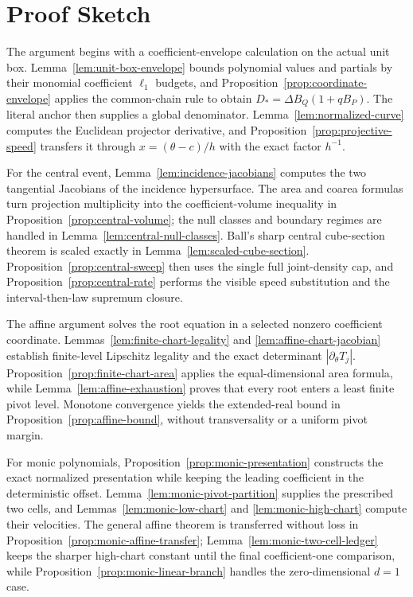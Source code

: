 \section{Proof Sketch}

The argument begins with a coefficient-envelope calculation on the actual
unit box.  Lemma~\ref{lem:unit-box-envelope} bounds polynomial values and
partials by their monomial coefficient $\ell_1$ budgets, and
Proposition~\ref{prop:coordinate-envelope} applies the common-chain rule to
obtain $D_*=\Delta B_Q(1+qB_P)$.  The literal anchor then supplies a global
denominator.  Lemma~\ref{lem:normalized-curve} computes the Euclidean
projector derivative, and Proposition~\ref{prop:projective-speed} transfers it
through $x=(\theta-c)/h$ with the exact factor $h^{-1}$.

For the central event, Lemma~\ref{lem:incidence-jacobians} computes the two
tangential Jacobians of the incidence hypersurface.  The area and coarea
formulas \citep{federer1969gmt} turn projection multiplicity into the
coefficient-volume inequality in Proposition~\ref{prop:central-volume}; the
null classes and boundary regimes are handled in
Lemma~\ref{lem:central-null-classes}.  Ball's sharp central cube-section
theorem \citep{ball1986cube} is scaled exactly in
Lemma~\ref{lem:scaled-cube-section}.  Proposition~\ref{prop:central-sweep}
then uses the single full joint-density cap, and
Proposition~\ref{prop:central-rate} performs the visible speed substitution
and the interval-then-law supremum closure.

The affine argument solves the root equation in a selected nonzero
coefficient coordinate.  Lemmas~\ref{lem:finite-chart-legality} and
\ref{lem:affine-chart-jacobian} establish finite-level Lipschitz legality and
the exact determinant $|\partial_\theta T_j|$.
Proposition~\ref{prop:finite-chart-area} applies the equal-dimensional area
formula, while Lemma~\ref{lem:affine-exhaustion} proves that every root enters
a least finite pivot level.  Monotone convergence yields the extended-real
bound in Proposition~\ref{prop:affine-bound}, without transversality or a
uniform pivot margin.

For monic polynomials, Proposition~\ref{prop:monic-presentation} constructs
the exact normalized presentation while keeping the leading coefficient in
the deterministic offset.  Lemma~\ref{lem:monic-pivot-partition} supplies the
prescribed two cells, and Lemmas~\ref{lem:monic-low-chart} and
\ref{lem:monic-high-chart} compute their velocities.  The general affine
theorem is transferred without loss in
Proposition~\ref{prop:monic-affine-transfer};
Lemma~\ref{lem:monic-two-cell-ledger} keeps the sharper high-chart constant
until the final coefficient-one comparison, while
Proposition~\ref{prop:monic-linear-branch} handles the zero-dimensional
$d=1$ case.

